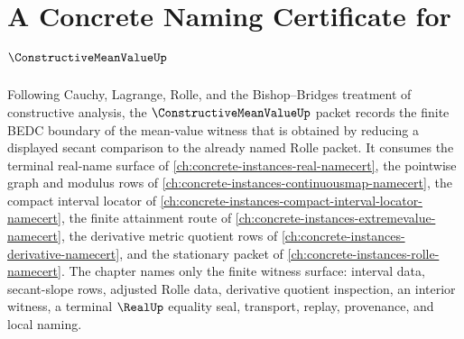\chapter{A Concrete Naming Certificate for $\ConstructiveMeanValueUp$}
\label{ch:concrete-instances-constructive-mean-value-namecert}

Following Cauchy, Lagrange, Rolle, and the Bishop--Bridges treatment of constructive analysis, the $\ConstructiveMeanValueUp$ packet records the finite BEDC boundary of the mean-value witness that is obtained by reducing a displayed secant comparison to the already named Rolle packet. It consumes the terminal real-name surface of \autoref{ch:concrete-instances-real-namecert}, the pointwise graph and modulus rows of \autoref{ch:concrete-instances-continuousmap-namecert}, the compact interval locator of \autoref{ch:concrete-instances-compact-interval-locator-namecert}, the finite attainment route of \autoref{ch:concrete-instances-extremevalue-namecert}, the derivative metric quotient rows of \autoref{ch:concrete-instances-derivative-namecert}, and the stationary packet of \autoref{ch:concrete-instances-rolle-namecert}. The chapter names only the finite witness surface: interval data, secant-slope rows, adjusted Rolle data, derivative quotient inspection, an interior witness, a terminal $\RealUp$ equality seal, transport, replay, provenance, and local naming.

